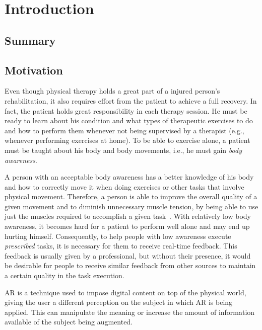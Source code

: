 \chapter{Introduction}
\label{sec:intro}

\section*{Summary}

\section{Motivation}


Even though physical therapy holds a great part of a injured person's rehabilitation, 
it also requires effort from the patient to achieve a full recovery.
In fact, the patient holds great responsibility in each therapy session.
He must be ready to learn about his condition and what types of therapeutic exercises 
to do and how to perform them whenever not being supervised by a therapist (e.g., whenever performing exercises at home).
To be able to exercise alone, a patient must be taught about his body and body 
movements, i.e., he must gain \emph{body awareness}.

A person with an acceptable body awareness has a better knowledge of his body and how to correctly move it when doing exercises or other tasks that involve physical movement.
Therefore, a person is able to improve the overall quality of a given movement and to diminish unnecessary muscle tension, 
by being able to use just the muscles required to accomplish a given task~\cite{Singh2014a}.
With relatively low body awareness, it becomes hard for a patient to perform well alone and may 
end up hurting himself. %
Consequently, to help people with low awareness 
execute \textit{prescribed} tasks, it is necessary for them to receive real-time feedback.
This feedback is usually given by a professional, 
but without their presence, it would be desirable for people to receive similar feedback from other sources to maintain a certain quality in the task execution.

\ac{AR} is a technique used to impose digital content on top of the physical world, giving the user a different perception on the subject in which \ac{AR} is being applied. 
This can manipulate the meaning or increase the amount of information available of the subject being augmented.

